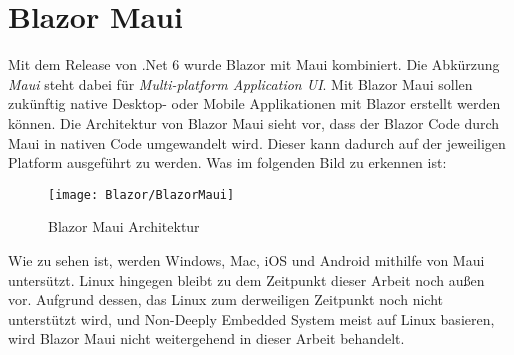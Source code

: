 \section{Blazor Maui}
\label{sec:blazormaui}
Mit dem Release von .Net 6 wurde Blazor mit Maui kombiniert. Die Abkürzung \emph{Maui} steht dabei
für \emph{Multi-platform Application UI}. Mit
Blazor Maui sollen zukünftig native Desktop-  oder Mobile Applikationen mit Blazor erstellt werden
können.
\newline
\newline
Die Architektur von Blazor Maui sieht vor, dass der Blazor Code durch Maui in nativen Code
umgewandelt wird. Dieser kann dadurch auf der jeweiligen Platform ausgeführt zu werden. Was im
folgenden Bild zu erkennen ist:
\newpage
\begin{figure}[h]
    \centering
    \texttt{[image: Blazor/BlazorMaui]}
    \caption[Blazor Maui Architektur]{Blazor Maui Architektur}
    \label{img:BlazorMaui}
\end{figure}

Wie zu sehen ist, werden Windows, Mac, iOS und Android mithilfe von Maui untersützt. Linux
hingegen bleibt zu dem Zeitpunkt dieser Arbeit noch außen vor.
\newline
\newline
Aufgrund dessen, das Linux zum derweiligen Zeitpunkt noch nicht unterstützt wird, und Non-Deeply
Embedded System meist auf Linux basieren, wird Blazor Maui nicht weitergehend in dieser Arbeit
behandelt.